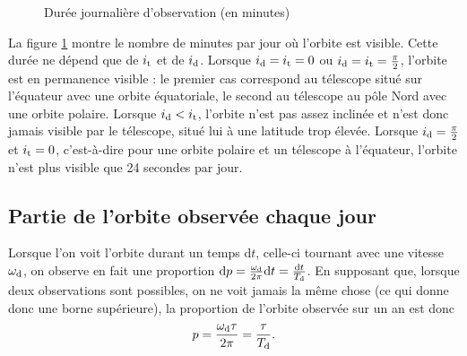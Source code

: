 \begin{figure}
\scriptsize
\begin{center}
\def\svgwidth{0.5\linewidth}
 
 \vspace*{-2em}
\caption{Durée journalière d'observation (en minutes)} \label{nicolas:observabilite}
\end{center}
\end{figure}%

La figure \ref{nicolas:observabilite} montre le nombre de minutes par jour où l'orbite est visible. Cette durée ne dépend que de $i_\text{t}$ et de $i_\text{d}$. Lorsque $i_\text{d}=i_\text{t}=0$ ou $i_\text{d}=i_\text{t}=\frac{\pi}{2}$, l'orbite est en permanence visible : le premier cas correspond au télescope situé sur l'équateur avec une orbite équatoriale, le second au télescope au pôle Nord avec une orbite polaire. Lorsque $i_\text{d} < i_\text{t}$, l'orbite n'est pas assez inclinée et n'est donc jamais visible par le télescope, situé lui à une latitude trop élevée. Lorsque $i_\text{d} = \frac{\pi}{2}$ et $i_\text{t} = 0$, c'est-à-dire pour une orbite polaire et un télescope à l'équateur, l'orbite n'est plus visible que 24 secondes par jour. 


\subsection{Partie de l'orbite observée chaque jour}

Lorsque l'on voit l'orbite durant un temps $\mathrm{d}t$, celle-ci tournant avec une vitesse $\omega_\text{d}$, on observe en fait une proportion $\mathrm{d}p = \frac{\omega_\text{d}}{2\pi} \mathrm{d} t = \frac{\mathrm{d}t}{T_\text{d}}$. En supposant que, lorsque deux observations sont possibles, on ne voit jamais la même chose (ce qui donne donc une borne supérieure), la proportion de l'orbite observée sur un an est donc
\[ p = \frac{\omega_\text{d} \tau}{2\pi} = \frac{\tau}{T_\text{d}}.\]


